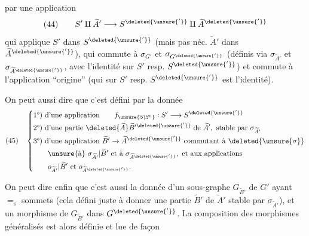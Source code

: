 par une application
\[
(44)\qquad S'\amalg\widetilde A'\longrightarrow S^{\deleted{\unsure{'}}}\amalg\widetilde A^{\deleted{\unsure{'}}}
\]
qui applique $S'$ dans $S^{\deleted{\unsure{'}}}$ (mais pas néc. $\widetilde A'$ dans $\widetilde A^{\deleted{\unsure{'}}}$), qui commute à $\sigma_{G'}$ et $\sigma_{G^{\deleted{\unsure{'}}}}$ (définis via $\sigma_{\widetilde A'}$ et $\sigma_{\widetilde A^{\deleted{\unsure{'}}}}$, avec l'identité sur $S'$ resp. $S^{\deleted{\unsure{'}}}$) et commute à l'application ``origine'' (qui sur $S'$ resp. $S^{\deleted{\unsure{'}}}$ est l'identité).

On peut aussi dire que c'est défini par la donnée
\[
(45)\quad\left\{\begin{aligned}
&\text{1°) d'une application}\qquad f_{\unsure{S|S^0}}:S'\longrightarrow S^{\deleted{\unsure{'}}}\\
&\text{2°) d'une partie }\deleted{\widetilde A}\widetilde B^{\prime\deleted{\unsure{'}}}\text{ de }\widetilde A',\text{ stable par }\sigma_{\widetilde A'}\\
&\text{3°) d'une application }\widetilde B'\to\widetilde A^{\deleted{\unsure{'}}}\text{ commutant à }\deleted{\unsure{\sigma}}\\
&\qquad\unsure{\text{à}}\ \sigma_{\widetilde A'}|\widetilde B'\text{ et à }\sigma_{\widetilde A^{\deleted{\unsure{'}}}},\text{ et aux applications}\\
&\qquad o_{\widetilde A'}|\widetilde B'\text{ et }o_{\widetilde A^{\deleted{\unsure{'}}}}.
\end{aligned}\right.
\]

On peut dire enfin que c'est aussi la donnée d'un sous-graphe $G_{\widetilde B'}$ de $G'$ ayant $=_{\mathrm s}$ sommets (cela défini juste  à donner une partie $\widetilde B'$ de $\widetilde A'$ stable par $\sigma_{\widetilde A'}$), et un morphisme de $G_{\widetilde B'}$ dans $G^{\deleted{\unsure{'}}}$. La composition des morphismes généralisés est alors définie et lue de façon
